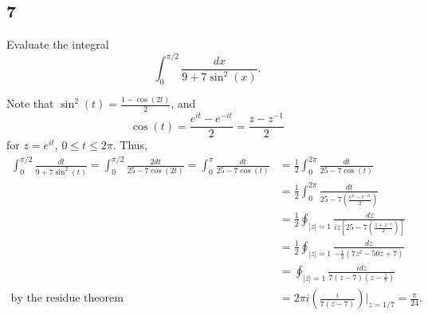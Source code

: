 \documentclass[12pt]{article}
\begin{document}
\subsection*{7}
\begin{tcolorbox}
Evaluate the integral
\[ \int_{0}^{\pi/2}\frac{dx}{9 + 7\sin^{2}(x)}. \]
\end{tcolorbox}
Note that $\sin^2(t) = \frac{1 - \cos(2t)}{2}$, and
\[ \cos(t) = \frac{e^{it} - e^{-it}}{2} = \frac{z - z^{-1}}{2} \]
for $z = e^{it}$, $0 \leq t \leq 2\pi$. Thus,
\begin{align*}
\int_{0}^{\pi/2}\frac{dt}{9 + 7\sin^2(t)} = \int_{0}^{\pi/2}\frac{2dt}{25 - 7\cos(2t)} = \int_{0}^{\pi}\frac{dt}{25 - 7\cos(t)} & =
\frac{1}{2}\int_{0}^{2\pi}\frac{dt}{25 - 7\cos(t)} \\
& = \frac{1}{2}\int_{0}^{2\pi}\frac{dt}{25 - 7\left( \frac{e^{it} - e^{-it}}{2} \right)} \\
& = \frac{1}{2}\oint_{|z| = 1}\frac{dz}{iz\left[ 25 - 7\left( \frac{z + z^{-1}}{2} \right) \right]} \\
& = \frac{1}{2}\oint_{|z| = 1}\frac{dz}{-\frac{i}{2}(7z^2 - 50z + 7)} \\
& = \oint_{|z| = 1}\frac{idz}{7(z - 7)(z - \frac{1}{7})} \\
\text{by the residue theorem } \qquad & = 2\pi i \left( \frac{i}{7(z - 7)} \right)\bigg|_{z = 1/7} = \frac{\pi}{24}.
\end{align*}




\newpage
\end{document}
